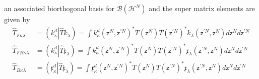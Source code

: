 \documentclass[aps,preprint]{revtex4}%
\begin{document}
an associated biorthogonal basis for $\mathcal{B}\left(  \mathcal{H}%
^{N}\right)  $ and the super matrix elements are given by
\begin{align}
\hat{T}_{F\kappa\lambda}  &  =\left(  k_{\kappa}^{d}\left\vert \hat{T}\right.
k_{\lambda}\right)  =\int k_{\kappa}^{d}\left(  \mathsf{z}^{N},\mathsf{z}%
^{\prime N}\right)  ^{\ast}T\left(  \mathsf{z}^{N}\right)  T\left(
\mathsf{z}^{\prime N}\right)  ^{\ast}k_{\lambda}\left(  \mathsf{z}^{\prime
N},\mathsf{z}^{N}\right)  d\mathsf{z}^{N}d\mathsf{z}^{\prime N}\nonumber\\
\hat{T}_{FB\kappa\lambda}  &  =\left(  k_{\kappa}^{d}\left\vert \hat
{T}\right.  \mathfrak{x}_{\lambda}\right)  =\int k_{\kappa}^{d}\left(
\mathsf{z}^{N},\mathsf{z}^{\prime N}\right)  ^{\ast}T\left(  \mathsf{z}%
^{N}\right)  T\left(  \mathsf{z}^{\prime N}\right)  ^{\ast}\mathfrak{x}%
_{\lambda}\left(  \mathsf{z}^{\prime N},\mathsf{z}^{N}\right)  d\mathsf{z}%
^{N}d\mathsf{z}^{\prime N}\nonumber\\
\hat{T}_{B\kappa\lambda}  &  =\left(  \mathfrak{x}_{\kappa}^{d}\left\vert
\hat{T}\right.  \mathfrak{x}_{\lambda}\right)  =\int\mathfrak{x}_{\kappa}%
^{d}\left(  \mathsf{z}^{N},\mathsf{z}^{\prime N}\right)  ^{\ast}T\left(
\mathsf{z}^{N}\right)  T\left(  \mathsf{z}^{\prime N}\right)  ^{\ast
}\mathfrak{x}_{\lambda}\left(  \mathsf{z}^{\prime N},\mathsf{z}^{N}\right)
d\mathsf{z}^{N}d\mathsf{z}^{\prime N} \label{matel}%
\end{align}
\end{document}
